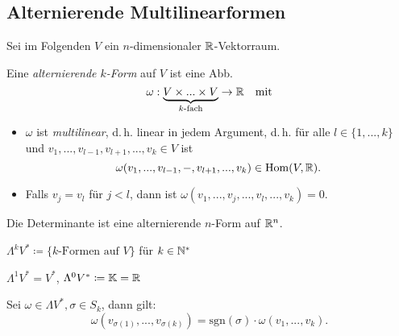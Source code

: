\documentclass{cheat-sheet}
\theoremstyle{definition}
\begin{document}
\begin{samepage}



\section{Alternierende Multilinearformen}

\begin{nota}
  Sei im Folgenden $V$ ein $n$-dimensionaler $\mathbb{R}$-Vektorraum.
\end{nota}

\begin{defn}
  Eine \emph{alternierende $k$-Form} auf $V$ ist eine Abb.
  \[ \omega : \underbrace{V \times ... \times V}_{\text{$k$-fach}} \to \mathbb{R} \quad \text{mit} \]
  \begin{itemize}
    \item $\omega$ ist \emph{multilinear}, d.\,h. linear in jedem Argument, d.\,h. für alle $l \in \{ 1, ..., k \}$ und $v_1, ..., v_{l-1}, v_{l+1}, ..., v_k \in V$ ist
    \[ \omega(v_1, ..., v_{l-1}, -, v_{l+1}, ..., v_k) \in \mathrm{Hom}(V, \mathbb{R}). \]
    \item Falls $v_j = v_l$ für $j < l$, dann ist $\omega(v_1, ..., v_j, ..., v_l, ..., v_k) = 0$.
  \end{itemize}
\end{defn}

\begin{bsp}
  Die Determinante ist eine alternierende $n$-Form auf $\mathbb{R}^n$.
\end{bsp}

\begin{nota}
  $\Lambda^k V^* \coloneqq \{ \text{$k$-Formen auf $V$} \}$ für $k \in \mathbb{N}^*$
\end{nota}

\begin{bem}
  $\Lambda^1 V^* = V^*$, $\Lambda^0 V^* \coloneqq \mathbb{K} = \mathbb{R}$
\end{bem}

\begin{lem}
  Sei $\omega \in \Lambda V^*, \sigma \in S_k$, dann gilt:
  \[ \omega(v_{\sigma(1)}, ..., v_{\sigma(k)}) = \mathrm{sgn}(\sigma) \cdot \omega(v_1, ..., v_k). \]
\end{lem}

\end{samepage}

\iffalse
\begin{nota}
  $\Lambda V^* \coloneqq \oplus_{k=1}^n \Lambda^k V^*$
\end{nota}
\fi
\end{document}
